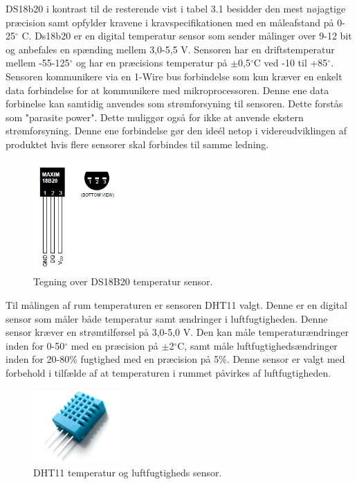 DS18b20 i kontrast til de resterende vist i tabel 3.1 besidder den mest nøjagtige præcision samt opfylder kravene i kravspecifikationen med en måleafstand på 0-25$^{\circ}$ C. \newline
Ds18b20 er en digital temperatur sensor som sender målinger over 9-12 bit og anbefales en spænding mellem 3,0-5,5 V. \newline
Sensoren har en driftstemperatur mellem -55-125$^{\circ}$ og har en præcisions temperatur på $\pm$0,5$^{\circ}$C ved -10 til +85$^{\circ}$. Sensoren kommunikere via en 1-Wire bus forbindelse som kun kræver en enkelt data forbindelse for at kommunikere med mikroprocessoren. Denne ene data forbinelse kan samtidig anvendes som strømforsyning til sensoren. Dette forstås som "parasite power". Dette muliggør også for ikke at anvende ekstern strømforsyning. 
Denne ene forbindelse gør den ideél netop i videreudviklingen af produktet hvis flere sensorer skal forbindes til samme ledning.

\begin{figure}[h!]
  \centering
  \includegraphics[width=0.3\textwidth]{figures/ds18b20-pinout.jpg}
  \caption{Tegning over DS18B20 temperatur sensor.}
  \label{ds18b20_pins}
\end{figure} 

Til målingen af rum temperaturen er sensoren DHT11 valgt. Denne er en digital sensor som måler både temperatur samt ændringer i luftfugtigheden. Denne sensor kræver en strømtilførsel på 3,0-5,0 V. \newline
Den kan måle temperaturændringer inden for 0-50$^{\circ}$ med en præcision på $\pm$2$^{\circ}$C, samt måle luftfugtighedsændringer inden for 20-80\% fugtighed med en præcision på 5\%. 
Denne sensor er valgt med forbehold i tilfælde af at temperaturen i rummet påvirkes af luftfugtigheden.

\begin{figure}[h!]
  \centering
  \includegraphics[width=0.3\textwidth]{figures/DHT11.jpg}
  \caption{DHT11 temperatur og luftfugtigheds sensor.}
  \label{dht11_billede}
\end{figure} 
   






\newpage

